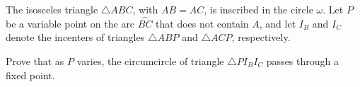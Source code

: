 The isosceles triangle $\triangle ABC$, with $AB=AC$, is inscribed in the circle $\omega$. Let $P$ be a variable point on the arc $\stackrel{\frown}{BC}$ that does not contain $A$, and let $I_B$ and $I_C$ denote the incenters of triangles $\triangle ABP$ and $\triangle ACP$, respectively.

Prove that as $P$ varies, the circumcircle of triangle $\triangle PI_BI_C$ passes through a fixed point.